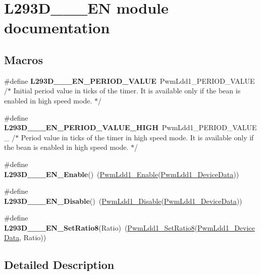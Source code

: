 \hypertarget{group___l293_d__1__2___e_n__module}{}\section{L293\+D\+\_\+\_\+\_\+\+EN module documentation}
\label{group___l293_d__1__2___e_n__module}
\subsection*{Macros}
\begin{DoxyCompactItemize}
\item 
\mbox{\label{group___l293_d__1__2___e_n__module_gacfadd6602ca55d597fddf422f72ecdff}} 
\#define {\bfseries L293\+D\+\_\+\_\+\_\+\+E\+N\+\_\+\+P\+E\+R\+I\+O\+D\+\_\+\+V\+A\+L\+UE}~Pwm\+Ldd1\+\_\+\+P\+E\+R\+I\+O\+D\+\_\+\+V\+A\+L\+UE /$\ast$ Initial period value in ticks of the timer. It is available only if the bean is enabled in high speed mode. $\ast$/
\item 
\mbox{\label{group___l293_d__1__2___e_n__module_gacbe27b7e18c3f6e4fad5d11c995c116b}} 
\#define {\bfseries L293\+D\+\_\+\_\+\_\+\+E\+N\+\_\+\+P\+E\+R\+I\+O\+D\+\_\+\+V\+A\+L\+U\+E\+\_\+\+H\+I\+GH}~Pwm\+Ldd1\+\_\+\+P\+E\+R\+I\+O\+D\+\_\+\+V\+A\+L\+U\+E\+\_ /$\ast$ Period value in ticks of the timer in high speed mode. It is available only if the bean is enabled in high speed mode. $\ast$/
\item 
\mbox{\label{group___l293_d__1__2___e_n__module_ga4cf023dbcce7661522b53a15135813c3}} 
\#define {\bfseries L293\+D\+\_\+\_\+\_\+\+E\+N\+\_\+\+Enable}()~(\hyperlink{group___pwm_ldd1__module_gaf9431af80fbe8bb8cd7e756d4b54968f}{Pwm\+Ldd1\+\_\+\+Enable}(\hyperlink{group___pwm_ldd1__module_ga1b3859d3bd55122c9154a66be455b8d9}{Pwm\+Ldd1\+\_\+\+Device\+Data}))
\item 
\mbox{\label{group___l293_d__1__2___e_n__module_gafe77e8b30b0e9ab7f7541230417fc6a5}} 
\#define {\bfseries L293\+D\+\_\+\_\+\_\+\+E\+N\+\_\+\+Disable}()~(\hyperlink{group___pwm_ldd1__module_gadaeb47f81e90a1e38e65d1bc79fbe794}{Pwm\+Ldd1\+\_\+\+Disable}(\hyperlink{group___pwm_ldd1__module_ga1b3859d3bd55122c9154a66be455b8d9}{Pwm\+Ldd1\+\_\+\+Device\+Data}))
\item 
\mbox{\label{group___l293_d__1__2___e_n__module_ga7b3de5b6d25e095f4267954d7037b525}} 
\#define {\bfseries L293\+D\+\_\+\_\+\_\+\+E\+N\+\_\+\+Set\+Ratio8}(Ratio)~(\hyperlink{group___pwm_ldd1__module_gacc3364eaed4b107d6f9c1e5b0c4325ef}{Pwm\+Ldd1\+\_\+\+Set\+Ratio8}(\hyperlink{group___pwm_ldd1__module_ga1b3859d3bd55122c9154a66be455b8d9}{Pwm\+Ldd1\+\_\+\+Device\+Data}, Ratio))
\end{DoxyCompactItemize}


\subsection{Detailed Description}
